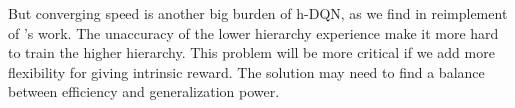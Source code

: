 \documentclass{article}
\newcommand{\Acknowledgement}[1]{\ \\{\bf Acknowledgement:} #1}
\begin{document}
\begin{spacing}{1.1}

    But converging speed is another big burden of h-DQN, as we find in reimplement of \cite{AI-16}'s work. The unaccuracy of the lower hierarchy experience make it more hard to train the higher hierarchy. This problem will be more critical if we add more flexibility for giving intrinsic reward. The solution may need to find a balance between efficiency and generalization power.
    
    



    \end{spacing}
    
\end{document}
